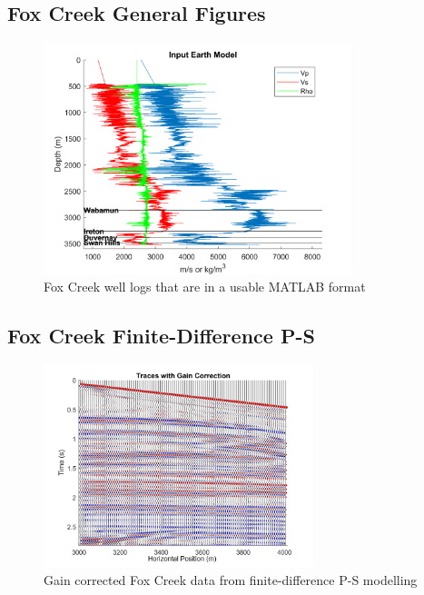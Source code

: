\documentclass[12pt]{article}
\begin{document}
\subsection{Fox Creek General Figures}
\begin{figure}[!htb]
	\centering
	\includegraphics[width=0.8\textwidth]{Figures/FInputModel.png}
	\caption[Fox Creek MATLAB well logs]{Fox Creek well logs that are in a usable MATLAB format}
	\label{fig:FCmlog}
\end{figure}	
\FloatBarrier
\pagebreak

\subsection{Fox Creek Finite-Difference P-S}

\begin{figure}[!htb]
	\centering
	\includegraphics[width=0.7\textwidth]{Figures/FDCgain.png}
	\caption[Fox Creek finite-difference P-S gain correction]{Gain corrected Fox Creek data from finite-difference P-S modelling}
	\label{fig:FDCgain}
\end{figure}	
\end{document}
